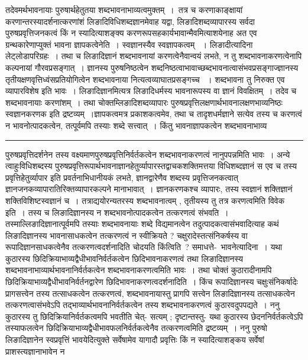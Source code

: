 \documentclass[11pt, openany]{book}
\begin{document}
 तदेवमर्थभावनायाः पुरुषार्थहेतुतया शब्दभावनाभाव्यत्वमुक्तम्~।~तत्र च करणाकाङ्क्षायां करणान्तरस्यादर्शनात्करणांशं लिङादिविधिशब्दज्ञानमेवाह यद्वा,
लिङादिशब्दव्यापारस्य सर्वदा पुरुषप्रवृत्तिजनकत्वं किं न स्यादित्याशङ्क्य
करणरूपसहकार्यभावान्मैवमित्याशयेनाह  अत एव ग्रन्थकारेणाप्युक्तं भावना ज्ञापकत्वेनेति~। स्वज्ञानस्यैव स्वज्ञापकत्वम्
~। लिङादीत्यादिना लेट्लोडापरिग्रहः~। तथा च लिङादिज्ञानं शब्दभावनायां करणत्वेनैवान्वयं लभते, न तु शब्दभावनाकरणत्वेनापि कल्पनायां गौरवप्रसङ्गात्~। ज्ञानस्य पुरुषनिष्ठत्वेन शब्दनिष्ठत्वाभावाच्छब्दभावनात्वासंभवप्रसङ्गाज्ज्ञानस्य तृतीयक्षणवृत्तिध्वंसप्रतियोगित्वेन शब्दभावनाया नित्यत्वव्याघातप्रसङ्गच्च ~। शब्दभावना तु निरुक्त एव व्यापारविशेष इति भावः~। लिङादिज्ञानमित्यत्र लिङादिधर्मस्य भावनारूपस्य वा ज्ञानं विवक्षितम्~। तदेव च शब्दभावनायाः करणांशम्~। तथा चोक्तम्\textendash  लिङादिशब्दव्यापारः पुरुषप्रवृत्तिलक्षणार्थभावनालक्षणभाव्यनिष्ठः स्वज्ञानकरणक इति द्रष्टव्यम्~।ज्ञापकत्वमत्र प्रकाशकत्वमेव, तथा च तादृशधर्मज्ञाने सत्येव
\newpage
\fancyhead[LO]{वैदिकभेदौ ]}
{\bl\noindent
तस्य च करणत्वं न भावनोत्पादकत्वेन, तत्पूर्वमपि तस्याः शब्दे सत्त्वात्~। किंतु भावनाज्ञापकत्वेन शब्दभावनाभाव्य }\\
\hrule
\vspace{3mm}
\noindent
पुरुषप्रवृत्तिदर्शनेन तस्य वक्ष्यमाणपुरुषप्रवृत्तिनिर्वर्तकत्वेन शब्दभावनाकरणत्वं नानुपपन्नमिति भावः~। अन्ये त्वाहुः\textendash विधिशब्दस्य पुरुषप्रवृत्तिरूपार्थभावनाज्ञानहेतुर्व्यापारस्तद्वाचकशक्तिमत्तया विधिशब्दज्ञानं स एव च तस्य प्रवृत्तिहेतुर्व्यापार इति प्रवर्तनाभिधानीयकं लभते, ज्ञानद्वारेणैव शब्दस्य प्रवृत्तिजनकत्वात् ज्ञानजनकव्यापारातिरिक्तव्यापारकल्पने मानाभावात्~। ज्ञानकरणकश्च व्यापारः, तस्य स्वज्ञानं शक्तिज्ञानं शक्तिविशिष्टस्वज्ञानं च~। तत्राद्ययोरन्यतरस्य
शब्दभावनात्वम् , तृतीयस्य तु तत्र करणत्वमिति विवेक इति~। तस्य च लिङादिज्ञानस्य न शब्दभावनोत्पादकत्वेन तत्करणत्वं संभवति~। तस्माल्लिङादिज्ञानात्पूर्वमपि तस्याः शब्दभावनायाः शब्दे विद्यमानत्वेन तदुत्पादकत्वासंभवादित्याह कथं लिङादिज्ञानस्य भावनासाधकत्वेन तत्करणत्वं न स्वीक्रियते ?
चक्षुरादेस्तत्संनिकर्षस्य वा रूपादिज्ञानसाधकत्वेनैव तत्करणत्वदर्शनादिति चोदयति {\br किंत्विति~?} समाधत्ते-\ {\br भावनेत्यादिना~।} यथा कुठारस्य
छिदिक्रियाभाव्यद्वैधीभावनिर्वर्तकत्वेन छिदिभावनाकरणत्वं तथा लिङादिज्ञानस्य शब्दभावनाभाव्यार्थभावनानिर्वर्तकत्वेन शब्दभावनाकरणत्वमिति भावः~। तथा चोक्तं कुठारादीनामपि छिदिक्रियाभाव्यद्वैधीभावनिर्वर्तनद्वारेण छिदिभावनाकरणत्वदर्शनादिति~। किंच रूपादिज्ञानस्य चक्षुःसंनिकर्षादेः प्रागसत्त्वेन तस्य तत्साधकत्वेन तत्करणत्वं, शब्दभावनायास्तु प्रागपि सत्त्वेन लिङादिज्ञानस्य तत्साधकत्वेन तत्करणत्वासंभवेऽपि तद्भाव्यार्थभावनानिर्वर्तकत्वेन तस्य शब्दभावनाकरणत्वं कुठारवदुपपद्यते~। {\br ननु} कुठारस्य तु छिदिक्रियानिर्वर्तकत्वमपि भवतीति चेत्- सत्यम् ; दृष्टान्तस्तु- {\qt यथा कुठारस्य छेदननिर्वर्तकत्वेऽपि तस्याफलत्वेन छिदिक्रियाभाव्यद्वैधीभावफलनिर्वर्तकत्वेनैव तत्करणत्वमिति द्रष्टव्यम्~}। {\br ननु} पुरुषो लिङादिज्ञानेन स्वप्रवृत्तिं भावयेदित्युक्ते सर्वेषामेव यागादौ प्रवृत्तिः किं न स्यादित्याशङ्कय {\br सर्वेषां} प्राशस्त्यज्ञानाभावेन न
\end{document}
